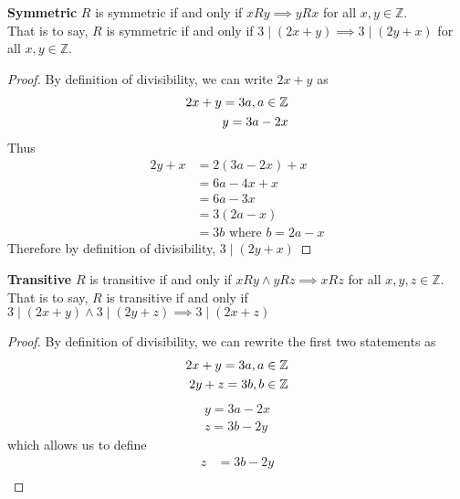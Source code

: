 \documentclass{article}
\begin{document}
\begin{enumerate}[label=\alph*.]
          \textbf{Symmetric}
          \(R\) is symmetric if and only if \(xRy \implies yRx\) for all \(x, y \in \mathbb{Z}\). \\
          That is to say, \(R\) is symmetric if and only if \(3 \mid (2x + y) \implies 3 \mid (2y + x)\) for all \(x, y \in \mathbb{Z}\).
          \begin{proof}
              By definition of divisibility, we can write \(2x + y\) as
              \begin{align*}
                  2x + y = 3a, \space a \in \mathbb{Z} \\
                  y = 3a - 2x
              \end{align*}
              Thus
              \begin{align*}
                  2y + x & = 2(3a - 2x) + x               \\
                         & = 6a - 4x + x                  \\
                         & = 6a - 3x                      \\
                         & = 3(2a - x)                    \\
                         & = 3b \text{ where } b = 2a - x
              \end{align*}
              Therefore by definition of divisibility, \(3 \mid (2y + x)\)
          \end{proof}
          \textbf{Transitive} \(R\) is transitive if and only if \(xRy \land yRz \implies xRz\) for all \(x, y, z \in \mathbb{Z}\). \\
          That is to say, \(R\) is transitive if and only if \(3 \mid (2x + y) \land 3 \mid (2y + z) \implies 3 \mid (2x + z)\)
          \begin{proof}
              By definition of divisibility, we can rewrite the first two statements as
              \begin{align*}
                  2x + y = 3a, \space a \in \mathbb{Z} \\
                  2y + z = 3b, \space b \in \mathbb{Z}
              \end{align*}
              \begin{align*}
                  y = 3a - 2x \\
                  z = 3b - 2y
              \end{align*}
              which allows us to define
              \begin{align*}
                  z & = 3b - 2y         \\

\end{align*}
\end{proof}
\end{enumerate}
\end{document}
